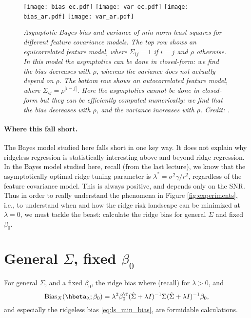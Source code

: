 \documentclass{article}
\begin{document}
\begin{figure}[p]
\centering
\texttt{[image: bias\_ec.pdf]}
\texttt{[image: var\_ec.pdf]}
\texttt{[image: bias\_ar.pdf]}
\texttt{[image: var\_ar.pdf]}
\caption{\it Asymptotic Bayes bias and variance of min-norm least squares for
  different feature covariance models. The top row shows an equicorrelated
  feature model, where $\Sigma_{ij} = 1$ if $i=j$ and $\rho$ otherwise. In this 
  model the asymptotics can be done in closed-form: we find the bias decreases
  with $\rho$, whereas the variance does not actually depend on $\rho$. The
  bottom row shows an autocorrelated feature model, where $\Sigma_{ij} = 
  \rho^{|i-j|}$. Here the asymptotics cannot be done in closed-form but they can  
  be efficiently computed numerically: we find that the bias decreases with
  $\rho$, and the variance increases with $\rho$. Credit:
  \citet{hastie2022surprises}.}      
\label{fig:risk_ec_ar}
\end{figure}

\paragraph{Where this fall short.}

The Bayes model studied here falls short in one key way. It does not explain why
ridgeless regression is statistically interesting above and beyond ridge
regression. In the Bayes model studied here, recall (from the last lecture), we
know that the asymptotically optimal ridge tuning parameter is $\lambda^* =
\sigma^2 \gamma / r^2$, regardless of the feature covariance model. This is
always positive, and depends only on the SNR. Thus in order to really understand
the phenomena in Figure \ref{fig:experiments}, i.e., to understand when and how
the ridge risk landscape can be minimized at $\lambda = 0$, we must tackle the
beast: calculate the ridge bias for general $\Sigma$ and fixed $\beta_0$.     

\section{General $\Sigma$, fixed $\beta_0$}

For general $\Sigma$, and a fixed $\beta_0$, the ridge bias where (recall)
 for $\lambda>0$,
and  
\begin{equation}
\label{eq:ridge_bias}
\Bias_X(\hbeta_\lambda; \beta_0) = \lambda^2 \beta_0^\T (\hSigma + \lambda
I)^{-1} \Sigma (\hSigma + \lambda I)^{-1} \beta_0,
\end{equation}
and especially the ridgeless bias \eqref{eq:ls_min_bias}, are formidable
calculations.   
\end{document}
